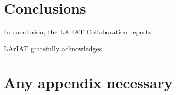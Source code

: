 \documentclass[%
 reprint,
 amsmath,amssymb,
 aps,
]{revtex4-1}
\begin{document}
\section{Conclusions}

In conclusion, the LArIAT Collaboration reports...

\acknowledgments

LArIAT gratefully acknowledges 
\appendix



\section{Any appendix necessary} \label{sec:Appendix}
\end{document}
